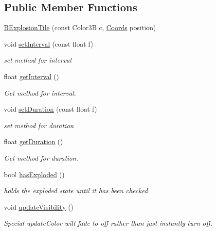 \subsection*{\-Public \-Member \-Functions}
\begin{DoxyCompactItemize}
\item 
\hyperlink{class_b_explosion_tile_aaa3e3d527dada2a0aec18c0144321832}{\-B\-Explosion\-Tile} (const \-Color3\-B c, \hyperlink{struct_coords}{\-Coords} position)
\item 
void \hyperlink{class_b_explosion_tile_a917731da768b4bb35255a853df6d80c8}{set\-Interval} (const float f)
\begin{DoxyCompactList}\small\item\em set method for interval \end{DoxyCompactList}\item 
float \hyperlink{class_b_explosion_tile_ab6a40589c3a728c8700f1f20a2fd7275}{get\-Interval} ()
\begin{DoxyCompactList}\small\item\em \-Get method for interval. \end{DoxyCompactList}\item 
void \hyperlink{class_b_explosion_tile_a85953e050b9d016fb182525f8d81294a}{set\-Duration} (const float f)
\begin{DoxyCompactList}\small\item\em set method for duration \end{DoxyCompactList}\item 
float \hyperlink{class_b_explosion_tile_a5eb4f1055a55608fe35341bb98a3c65f}{get\-Duration} ()
\begin{DoxyCompactList}\small\item\em \-Get method for duration. \end{DoxyCompactList}\item 
bool \hyperlink{class_b_explosion_tile_a0d54cd6a37386d3d31f3bb565783973a}{has\-Exploded} ()
\begin{DoxyCompactList}\small\item\em holds the exploded state until it has been checked \end{DoxyCompactList}\item 
void \hyperlink{class_b_explosion_tile_a4c58075332815284002ddcff3fa2c5b0}{update\-Visibility} ()
\begin{DoxyCompactList}\small\item\em \-Special update\-Color will fade to off rather than just instantly turn off. \end{DoxyCompactList}\item 

\end{DoxyCompactItemize}
